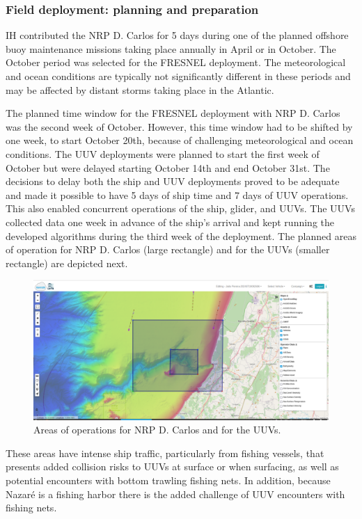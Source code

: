 \subsubsection{Field deployment: planning and preparation}

IH contributed the NRP D. Carlos for 5 days during one of the planned offshore buoy maintenance missions taking place annually in April or in October. The October period was selected for the FRESNEL deployment. The meteorological and ocean conditions are typically not significantly different in these periods and may be affected by distant storms taking place in the Atlantic.

The planned time window for the FRESNEL deployment with NRP D. Carlos was the second week of October. However, this time window had to be shifted by one week, to start October 20th, because of challenging meteorological and ocean conditions. The UUV deployments were planned to start the first week of October but were delayed starting October 14th and end October 31st. The decisions to delay both the ship and UUV deployments proved to be adequate and made it possible to have 5 days of ship time and 7 days of UUV operations. This also enabled concurrent operations of the ship, glider, and UUVs. The UUVs collected data one week in advance of the ship’s arrival and kept running the developed algorithms during the third week of the deployment. The planned areas of operation for NRP D. Carlos (large rectangle) and for the UUVs (smaller rectangle) are depicted next. 

\begin{figure}
    \centering
    \includegraphics[width=.7\linewidth]{fig/Opareaas.png}
    \caption{Areas of operations for NRP D. Carlos and for the UUVs.}
    \label{fig:opareas}
\end{figure}

These areas have intense ship traffic, particularly from fishing vessels, that presents added collision risks to UUVs at surface or when surfacing, as well as potential encounters with bottom trawling fishing nets. In addition, because Nazaré is a fishing harbor there is the added challenge of UUV encounters with fishing nets.

